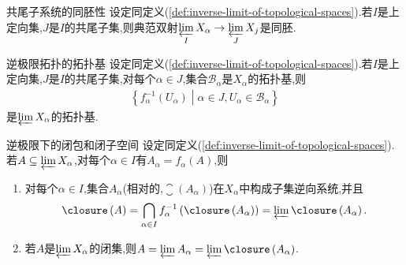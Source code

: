 \begin{proposition}{共尾子系统的同胚性}{}
	设定同定义(\ref{def:inverse-limit-of-topological-spaces}).若$I$是上定向集,$J$是$I$的共尾子集,则典范双射$\varprojlim\limits_{I}X_{\alpha}\to\varprojlim\limits_{J}X_{j}$是同胚.
\end{proposition}

\begin{proposition}{逆极限拓扑的拓扑基}{}
	设定同定义(\ref{def:inverse-limit-of-topological-spaces}).若$I$是上定向集,$J$是$I$的共尾子集,对每个$\alpha\in J$,集合$\mathcal{B}_{\alpha}$是$X_{\alpha}$的拓扑基,则
	\begin{align*}
		\left\{f_{\alpha}^{-1}\left(U_{\alpha}\right)\middle|\alpha\in J,U_{\alpha}\in\mathcal{B}_{\alpha}\right\}
	\end{align*}
	是$\varprojlim X_{\alpha}$的拓扑基.
\end{proposition}

\begin{corollary}{逆极限下的闭包和闭子空间}{}
	设定同定义(\ref{def:inverse-limit-of-topological-spaces}).若$A\subseteq\varprojlim X_{\alpha}$,对每个$\alpha\in I$有$A_{\alpha}=f_{\alpha}\left(A\right)$,则
	\begin{enumerate}
		\item 对每个$\alpha\in I$,集合$A_{\alpha}$(相对的,$\closure\left(A_{\alpha}\right)$)在$X_{\alpha}$中构成子集逆向系统,并且
		\begin{align*}
			\closure\left(A\right)=\bigcap\limits_{\alpha\in I}f_{\alpha}^{-1}\left(\closure\left(A_{\alpha}\right)\right)=\varprojlim\closure\left(A_{\alpha}\right).
		\end{align*}
		\item 若$A$是$\varprojlim X_{\alpha}$的闭集,则$A=\varprojlim A_{\alpha}=\varprojlim\closure\left(A_{\alpha}\right)$.
	\end{enumerate}
\end{corollary}


